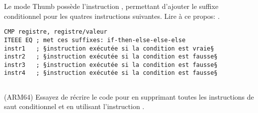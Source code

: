 
Le mode Thumb possède l'instruction , permettant d'ajouter le suffixe conditionnel
pour les quatres instructions suivantes.
Lire à ce propos: .

\begin{lstlisting}[caption=ARM (\ThumbMode),style=customasmARM]
CMP registre, registre/valeur
ITEEE EQ ; met ces suffixes: if-then-else-else-else
instr1   ; §instruction exécutée si la condition est vraie§
instr2   ; §instruction exécutée si la condition est fausse§
instr3   ; §instruction exécutée si la condition est fausse§
instr4   ; §instruction exécutée si la condition est fausse§
\end{lstlisting}

\subsection{\Exercise}

(ARM64) Essayez de récrire le code pour  en supprimant toutes
les instructions de saut conditionnel et en utilisant l'instruction .

